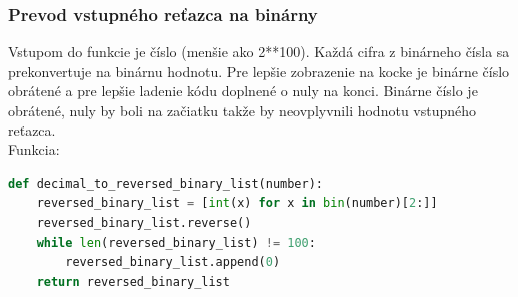 \subsubsection{Prevod vstupného reťazca na binárny}
Vstupom do funkcie je číslo (menšie ako 2**100). Každá cifra z binárneho čísla sa prekonvertuje na binárnu hodnotu. Pre lepšie zobrazenie na kocke je binárne číslo obrátené a pre lepšie ladenie kódu doplnené o nuly na konci. Binárne číslo je obrátené, nuly by boli na začiatku takže by neovplyvnili hodnotu vstupného reťazca. \\Funkcia:
\begin{lstlisting}[language=Python]
def decimal_to_reversed_binary_list(number):
    reversed_binary_list = [int(x) for x in bin(number)[2:]]
    reversed_binary_list.reverse()
    while len(reversed_binary_list) != 100:
        reversed_binary_list.append(0)
    return reversed_binary_list
\end{lstlisting}
